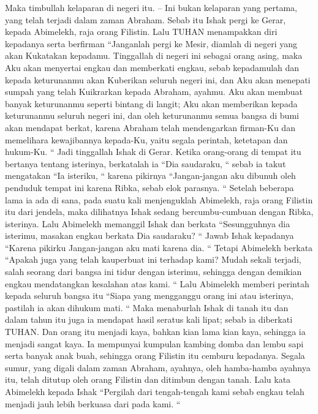 \begin{biblechapter} %
 Maka timbullah kelaparan di negeri itu. -- Ini bukan kelaparan yang pertama, yang telah terjadi dalam zaman Abraham. Sebab itu Ishak pergi ke Gerar, kepada Abimelekh, raja orang Filistin.
\verse Lalu TUHAN menampakkan diri kepadanya serta berfirman “Janganlah pergi ke Mesir, diamlah di negeri yang akan Kukatakan kepadamu.
\verse Tinggallah di negeri ini sebagai orang asing, maka Aku akan menyertai engkau dan memberkati engkau, sebab kepadamulah dan kepada keturunanmu akan Kuberikan seluruh negeri ini, dan Aku akan menepati sumpah yang telah Kuikrarkan kepada Abraham, ayahmu.
\verse Aku akan membuat banyak keturunanmu seperti bintang di langit; Aku akan memberikan kepada keturunanmu seluruh negeri ini, dan oleh keturunanmu semua bangsa di bumi akan mendapat berkat,
\verse karena Abraham telah mendengarkan firman-Ku dan memelihara kewajibannya kepada-Ku, yaitu segala perintah, ketetapan dan hukum-Ku. “
\verse Jadi tinggallah Ishak di Gerar.
\verse Ketika orang-orang di tempat itu bertanya tentang isterinya, berkatalah ia “Dia saudaraku, “ sebab ia takut mengatakan “Ia isteriku, “ karena pikirnya “Jangan-jangan aku dibunuh oleh penduduk tempat ini karena Ribka, sebab elok parasnya. “
\verse Setelah beberapa lama ia ada di sana, pada suatu kali menjenguklah Abimelekh, raja orang Filistin itu dari jendela, maka dilihatnya Ishak sedang bercumbu-cumbuan dengan Ribka, isterinya.
\verse Lalu Abimelekh memanggil Ishak dan berkata “Sesungguhnya dia isterimu, masakan engkau berkata Dia saudaraku? “ Jawab Ishak kepadanya “Karena pikirku Jangan-jangan aku mati karena dia. “
\verse Tetapi Abimelekh berkata “Apakah juga yang telah kauperbuat ini terhadap kami? Mudah sekali terjadi, salah seorang dari bangsa ini tidur dengan isterimu, sehingga dengan demikian engkau mendatangkan kesalahan atas kami. “
\verse Lalu Abimelekh memberi perintah kepada seluruh bangsa itu “Siapa yang mengganggu orang ini atau isterinya, pastilah ia akan dihukum mati. “
\verse Maka menaburlah Ishak di tanah itu dan dalam tahun itu juga ia mendapat hasil seratus kali lipat; sebab ia diberkati TUHAN.
\verse Dan orang itu menjadi kaya, bahkan kian lama kian kaya, sehingga ia menjadi sangat kaya.
\verse Ia mempunyai kumpulan kambing domba dan lembu sapi serta banyak anak buah, sehingga orang Filistin itu cemburu kepadanya.
\verse Segala sumur, yang digali dalam zaman Abraham, ayahnya, oleh hamba-hamba ayahnya itu, telah ditutup oleh orang Filistin dan ditimbun dengan tanah.
\verse Lalu kata Abimelekh kepada Ishak “Pergilah dari tengah-tengah kami sebab engkau telah menjadi jauh lebih berkuasa dari pada kami. “

\end{biblechapter}
